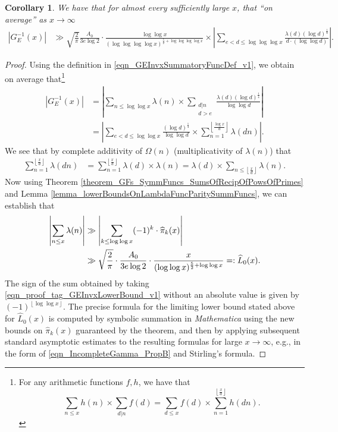 \documentclass[11pt,reqno,a4letter]{article}
\numberwithin{figure}{section}
\numberwithin{table}{section}
\newcommand{\cf}{\textit{cf.\ }}
\newcommand{\floor}[1]{\left\lfloor #1 \right\rfloor}
\newcommand{\Floor}[2]{\ensuremath{\left\lfloor \frac{#1}{#2} \right\rfloor}}
\theoremstyle{plain}
\newtheorem{cor}[theorem]{Corollary}
\numberwithin{theorem}{section}
\theoremstyle{definition}
\newcommand{\NBRef}[1]{}
\newcommand{\SuccSim}[0]{\overset{_{\scriptsize{\blacktriangle}}}{\succsim}}
\renewcommand{\SuccSim}[0]{\ensuremath{\gg}}
\begin{document}
\begin{cor} 
\label{cor_ASemiForm_ForGInvx_v1} 
We have that for almost every sufficiently large $x$, that 
``on average'' as $x \rightarrow \infty$ 
\begin{align*} 
\left\lvert G_E^{-1}(x) \right\rvert & \SuccSim 
     \sqrt{\frac{2}{\pi}} \frac{A_0}{3e \log 2} \cdot 
     \frac{\log\log x}{(\log\log\log\log x)^{\frac{5}{2} + \log\log\log\log x}} \times 
     \left\lvert \sum_{e < d \leq \log\log\log x} 
     \frac{\lambda(d) (\log d)^{\frac{1}{4}}}{d \cdot (\log\log d)} 
     \right\rvert. 
\end{align*} 
\end{cor} 
\NBRef{A10-2020.04-26} 
\begin{proof} 
Using the definition in \eqref{eqn_GEInvxSummatoryFuncDef_v1}, we obtain on average that\footnote{ 
     For any arithmetic functions $f,h$, we have that \cite[\cf \S 3.10; \S 3.12]{APOSTOLANUMT} 
     \[
     \sum_{n \leq x} h(n) \times \sum_{d|n} f(d) = \sum_{d \leq x} f(d) \times \sum_{n=1}^{\Floor{x}{d}} h(dn). 
     \] 
}
\begin{align*} 
\left\lvert G_E^{-1}(x) \right\rvert & = 
     \left\lvert \sum_{n \leq \log\log x} \lambda(n) \times 
     \sum_{\substack{d|n \\ d > e}} \frac{\lambda(d) (\log d)^{\frac{1}{4}}}{\log\log d} \right\rvert \\ 
     & = \left\lvert \sum_{e < d \leq \log\log x} \frac{(\log d)^{\frac{1}{4}}}{\log\log d} \times 
     \sum_{n=1}^{\Floor{\log x}{d}} \lambda(dn) \right\rvert. 
\end{align*} 
We see that by complete additivity of $\Omega(n)$ 
(multiplicativity of $\lambda(n)$) that 
\begin{align*} 
\sum_{n=1}^{\Floor{x}{d}} \lambda(dn) & = \sum_{n=1}^{\Floor{x}{d}} \lambda(d) \times \lambda(n) 
     = \lambda(d) \times \sum_{n \leq \Floor{x}{d}} \lambda(n). 
\end{align*} 
Now using Theorem \ref{theorem_GFs_SymmFuncs_SumsOfRecipOfPowsOfPrimes} and 
Lemma \ref{lemma_lowerBoundsOnLambdaFuncParitySummFuncs}, 
we can establish that 
\begin{align} 
\label{eqn_proof_tag_GEInvxLowerBound_v1} 
\left\lvert \sum_{n \leq x} \lambda(n) \right\rvert & \gg 
     \left\lvert \sum_{k \leq \log\log x} (-1)^k \cdot \widehat{\pi}_k(x) \right\rvert \\ 
\notag 
     & \gg \sqrt{\frac{2}{\pi}} \cdot \frac{A_0}{3e \log 2} \cdot 
     \frac{x}{(\log\log x)^{\frac{5}{2} + \log\log x}} 
     =: \widehat{L}_0(x). 
\end{align} 
The sign of the sum obtained by taking \eqref{eqn_proof_tag_GEInvxLowerBound_v1} without an 
absolute value is given by $(-1)^{\floor{\log\log x}}$. 
The precise formula for the 
limiting lower bound stated above for $\widehat{L}_0(x)$ is computed by symbolic summation 
in \emph{Mathematica} using the new bounds on $\widehat{\pi}_k(x)$ guaranteed by 
the theorem, and then by applying subsequent standard asymptotic estimates to the 
resulting formulas for large $x \rightarrow \infty$, e.g., 
in the form of \eqref{eqn_IncompleteGamma_PropB} and Stirling's formula. 


\end{proof}
\end{document}
